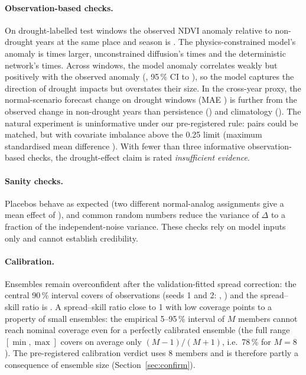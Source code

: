 \documentclass[10pt]{article}
\begin{document}
\paragraph{Observation-based checks.} On drought-labelled test windows the observed NDVI anomaly relative to
non-drought years at the same place and season is . The physics-constrained model's anomaly is
 times larger, unconstrained diffusion's  times and the
deterministic network's  times. Across windows, the model anomaly correlates weakly but
positively with the observed anomaly (, 95\,\% CI  to
), so the model captures the direction of drought impacts but overstates their size.
In the cross-year proxy, the normal-scenario forecast change on drought windows
(MAE ) is further from the observed change in non-drought years than persistence
() and climatology (). The natural
experiment is uninformative under our pre-registered rule:  pairs could be matched,
but with covariate imbalance above the 0.25 limit (maximum standardised mean difference
). With fewer than three informative observation-based checks, the drought-effect claim
is rated \emph{insufficient evidence}.
\paragraph{Sanity checks.} Placebos behave as expected (two different normal-analog assignments give a mean effect of
), and common random numbers reduce the variance of $\Delta$ to a fraction
 of the independent-noise variance. These checks rely on model inputs only and cannot
establish credibility.
\paragraph{Calibration.} Ensembles remain overconfident after the validation-fitted spread correction: the central
90\,\% interval covers  of observations (seeds 1 and 2: ,
) and the spread--skill ratio is . A spread--skill ratio
close to 1 with low coverage points to a property of small ensembles: the empirical 5--95\,\% interval of $M$
members cannot reach nominal coverage even for a perfectly calibrated ensemble (the full range $[\min,\max]$ covers on
average only $(M-1)/(M+1)$, i.e.\ 78\,\% for $M=8$). The pre-registered calibration verdict uses 8 members and is
therefore partly a consequence of ensemble size (Section~\ref{sec:confirm}).
\end{document}
